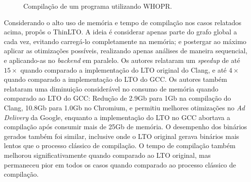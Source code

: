 \begin{figure}
\begin{center}
{
}
\end{center}
\caption{Compilação de um programa utilizando WHOPR.}
\label{fig:whopr_build}
\end{figure}


Considerando o alto uso de memória e tempo de compilação nos casos relatados
acima, \cite{Johnson:2017:TSI:3049832.3049845} propôs o ThinLTO. A ideia é
considerar apenas parte do grafo global a cada vez, evitando carregá-lo
completamente na memória; e postergar ao máximo aplicar as otimizações possíveis,
realizando apenas análises de maneira sequencial, e aplicando-as no 
\textit{backend} em paralelo.
Os autores relataram um \textit{speedup} de até $15\times$ quando comparado a
implementação do LTO original do Clang, e até $4\times$ quando comparado a
implementação do LTO do GCC. Os autores também relataram uma diminuição considerável
no consumo de memória quando comparado ao LTO do GCC: Redução de 2.9Gb para 1Gb
na compilação do Clang, 10.8Gb para 1.0Gb no Chromium, e permitiu melhores otimizações no
\textit{Ad Delivery} da Google, enquanto a implementação do LTO no GCC
abortava a compilação após consumir mais de 25Gb de memória. O desempenho dos
binários gerados também foi similar, inclusive onde o LTO original gerava
binários mais lentos que o processo clássico de compilação. O tempo de compilação
também melhorou significativamente quando comparado ao LTO original,
mas permaneceu pior em todos os casos quando comparado ao processo clássico de
compilação.

